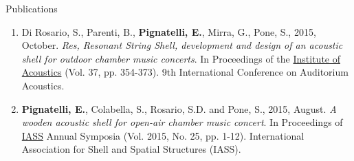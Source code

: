 \documentclass{resume}
\begin{document}
\begin{rSection}{Publications}
\begin{enumerate}[leftmargin=0.45cm, itemsep=0em, topsep=0.5em, parsep=0.2em]
        \item Di Rosario, S., Parenti, B., \textbf{Pignatelli, E.}, Mirra, G., Pone, S., 2015, October. \textit{Res, Resonant String Shell, development and design of an acoustic shell for outdoor chamber music concerts}. In Proceedings of the \underline{Institute of Acoustics} (Vol. 37, pp. 354-373). 9th International Conference on Auditorium Acoustics.
        \item \textbf{Pignatelli, E.}, Colabella, S., Rosario, S.D. and Pone, S., 2015, August. \textit{A wooden acoustic shell for open-air chamber music concert}. In Proceedings of \underline{IASS} Annual Symposia (Vol. 2015, No. 25, pp. 1-12). International Association for Shell and Spatial Structures (IASS).
    \end{enumerate}
    \end{rSection}
\end{document}
